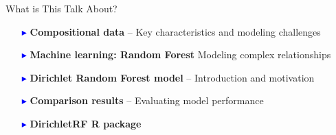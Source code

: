 \begin{frame}{What is This Talk About?}



\vspace{2em}

\nocite{In a nutshell, I will first talk about what compositional data are. Then, I will give a short literature review, including a brief history of compositional data and how this field developed. After that, I will move to the machine learning part, with a particular focus on Random Forests, and explain the model that we developed. I will also present some comparative results, where I compare our model with existing approaches. Finally, I will briefly introduce the R package that we developed.}

\vspace{1.5em}
\begin{itemize}
 
  \item[\textcolor{blue}{\large$\blacktriangleright$}] \textbf{Compositional data} -- Key characteristics and modeling challenges
    \vspace{1em}

    
  \item[\textcolor{blue}{\large$\blacktriangleright$}] \textbf{Machine learning: Random Forest} Modeling complex relationships
    \vspace{1em}
     \item[\textcolor{blue}{\large$\blacktriangleright$}] \textbf{ Dirichlet Random Forest model} -- Introduction and motivation
  \vspace{1em}

  \item[\textcolor{blue}{\large$\blacktriangleright$}] \textbf{Comparison results} -- Evaluating model performance
    \vspace{1em}
  \item[\textcolor{blue}{\large$\blacktriangleright$}] \textbf{
  DirichletRF R package}
\end{itemize}


\vspace{2em}

\end{frame}
